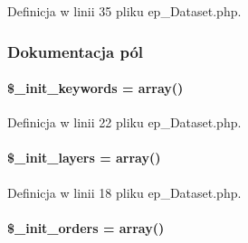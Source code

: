 Definicja w linii 35 pliku ep\-\_\-\-Dataset.\-php.



\subsubsection{Dokumentacja pól}
\hypertarget{classep___dataset_afc86aa4020238ff1f892690e0a004770}{
\paragraph[{\$\-\_\-init\-\_\-keywords}]{\setlength{\rightskip}{0pt plus 5cm}\$\-\_\-init\-\_\-keywords = array()\hspace{0.3cm}{\ttfamily [protected]}}}\label{classep___dataset_afc86aa4020238ff1f892690e0a004770}


Definicja w linii 22 pliku ep\-\_\-\-Dataset.\-php.

\hypertarget{classep___dataset_ab818f3e1d0a00e62e1f1f2b7a5aa1819}{
\paragraph[{\$\-\_\-init\-\_\-layers}]{\setlength{\rightskip}{0pt plus 5cm}\$\-\_\-init\-\_\-layers = array()\hspace{0.3cm}{\ttfamily [protected]}}}\label{classep___dataset_ab818f3e1d0a00e62e1f1f2b7a5aa1819}


Definicja w linii 18 pliku ep\-\_\-\-Dataset.\-php.

\hypertarget{classep___dataset_acc23fddba718484f9eee888d3b58660d}{
\paragraph[{\$\-\_\-init\-\_\-orders}]{\setlength{\rightskip}{0pt plus 5cm}\$\-\_\-init\-\_\-orders = array()\hspace{0.3cm}{\ttfamily [protected]}}}\label{classep___dataset_acc23fddba718484f9eee888d3b58660d}


